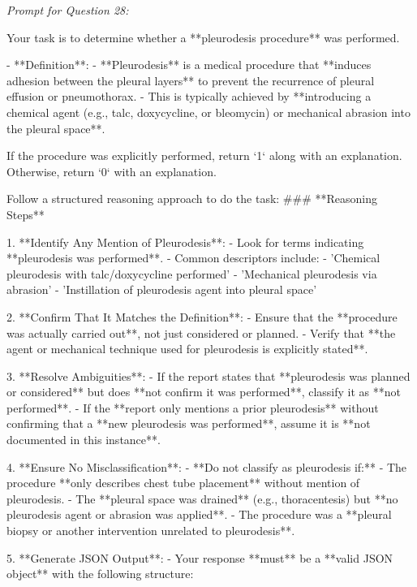 \textit{\normalsize Prompt for Question  28:}
\begin{mdframed}[]
\normalsize

Your task is to determine whether a **pleurodesis procedure** was performed.  

- **Definition**:  
  - **Pleurodesis** is a medical procedure that **induces adhesion between the pleural layers** to prevent the recurrence of pleural effusion or pneumothorax.  
  - This is typically achieved by **introducing a chemical agent (e.g., talc, doxycycline, or bleomycin) or mechanical abrasion into the pleural space**.  

If the procedure was explicitly performed, return `1` along with an explanation. Otherwise, return `0` with an explanation.

Follow a structured reasoning approach to do the task:
### **Reasoning Steps**  

1. **Identify Any Mention of Pleurodesis**:  
   - Look for terms indicating **pleurodesis was performed**.  
   - Common descriptors include:  
     - 'Chemical pleurodesis with talc/doxycycline performed'  
     - 'Mechanical pleurodesis via abrasion'  
     - 'Instillation of pleurodesis agent into pleural space'  

2. **Confirm That It Matches the Definition**:  
   - Ensure that the **procedure was actually carried out**, not just considered or planned.  
   - Verify that **the agent or mechanical technique used for pleurodesis is explicitly stated**.  

3. **Resolve Ambiguities**:  
   - If the report states that **pleurodesis was planned or considered** but does **not confirm it was performed**, classify it as **not performed**.  
   - If the **report only mentions a prior pleurodesis** without confirming that a **new pleurodesis was performed**, assume it is **not documented in this instance**.  

4. **Ensure No Misclassification**:  
   - **Do not classify as pleurodesis if:**  
     - The procedure **only describes chest tube placement** without mention of pleurodesis.  
     - The **pleural space was drained** (e.g., thoracentesis) but **no pleurodesis agent or abrasion was applied**.  
     - The procedure was a **pleural biopsy or another intervention unrelated to pleurodesis**.  

5. **Generate JSON Output**:  
   - Your response **must** be a **valid JSON object** with the following structure:  


\end{mdframed}

